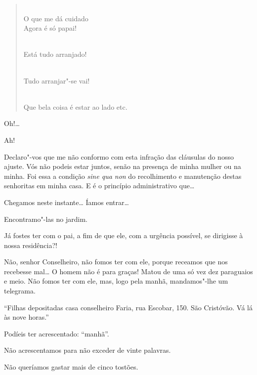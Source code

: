 \begin{verse}
\\
O que me dá cuidado\\  
Agora é só papai!

\\
Está tudo arranjado!

\\
Tudo arranjar"-se vai!

\\
Que bela coisa é estar ao lado etc.
\end{verse}





 Oh!\ldots

  Ah!

 Declaro"-vos que me não conformo com esta infração das cláusulas do
nosso ajuste. Vós não podeis estar juntos, senão na presença de minha mulher ou
na minha. Foi essa a condição \textit{sine qua non} do recolhimento e manutenção
destas senhoritas em minha casa. E é o princípio administrativo que\ldots

  Chegamos neste instante\ldots{} Íamos entrar\ldots

 Encontramo"-las no jardim. 

 Já fostes ter com o pai, a fim de que ele, com a urgência
possível, se dirigisse à nossa residência?!

 Não, senhor Conselheiro, não fomos ter com ele, porque receamos que
nos recebesse mal\ldots{} O homem não é para graças! Matou de uma só vez dez
paraguaios e meio. Não fomos ter com ele, mas, logo pela manhã, mandamos"-lhe um
telegrama.

 ``Filhas depositadas casa conselheiro Faria, rua Escobar, 150.
São Cristóvão. Vá lá às nove horas.''

 Podíeis ter acrescentado: ``manhã''.

 Não acrescentamos para não exceder de vinte palavras.

 Não queríamos gastar mais de cinco tostões.

